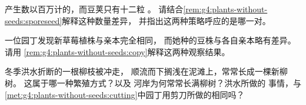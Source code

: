 \begin{exercise}[$\star\star$]\label{exo:g4:plants-without-seeds:9}
产生数以百万计的，而豆荚只有十二粒
。
请结合\cref{rem:g4:plants-without-seeds:sporeseed}解释这种数量差异，
并指出这两种策略呼应的是哪一对。
\end{exercise}

\begin{exercise}[$\star\star$]\label{exo:g4:plants-without-seeds:10}
一位园丁发现新草莓植株与亲本完全相同，
而她种的豆株与各自亲本略有差异。
请用
\cref{rem:g4:plants-without-seeds:copy}解释这两种观察结果。
\end{exercise}

\begin{exercise}[$\star\star\star$]\label{exo:g4:plants-without-seeds:11}
冬季洪水折断的一根柳枝被冲走，
顺流而下搁浅在泥滩上，常常长成一棵新柳树。
这属于哪一种繁殖方式？以及
河岸为何常常长满柳树？洪水所做的
事情，与
\cref{met:g4:plants-without-seeds:cutting}中园丁用剪刀所做的相同吗？
\end{exercise}
